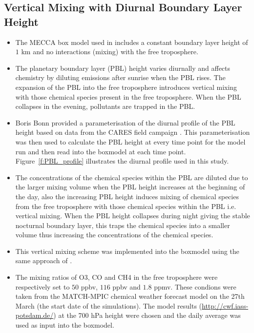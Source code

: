 \subsection{Vertical Mixing with Diurnal Boundary Layer Height} \label{ss:vertical_mixing}
\begin{itemize}
    \item The MECCA box model used in \citet{Coates:2015} includes a constant boundary layer height of $1$ km and no interactions (mixing) with the free troposphere.
    \item The planetary boundary layer (PBL) height varies diurnally and affects chemistry by diluting emissions after sunrise when the PBL rises. The expansion of the PBL into the free troposphere introduces vertical mixing with those chemical species present in the free troposphere. When the PBL collapses in the evening, pollutants are trapped in the PBL.
    \item Boris Bonn provided a parameterisation of the diurnal profile of the PBL height based on data from the CARES field campaign \citep{CARES:2008} . This parameterisation was then used to calculate the PBL height at every time point for the model run and then read into the boxmodel at each time point. Figure~\ref{f:PBL_profile} illustrates the diurnal profile used in this study.
    \item The concentrations of the chemical species within the PBL are diluted due to the larger mixing volume when the PBL height increases at the beginning of the day, also the increasing PBL height induces mixing of chemical species from the free troposphere with those chemical species within the PBL i.e. vertical mixing. When the PBL height collapses during night giving the stable nocturnal boundary layer, this traps the chemical species into a smaller volume thus increasing the concentrations of the chemical species.
    \item This vertical mixing scheme was implemented into the boxmodel using the same approach of \citet{Lourens:2012}.
    \item The mixing ratios of O3, CO and CH4 in the free troposphere were respectively set to $50$ ppbv, $116$ ppbv and $1.8$ ppmv. These condions were taken from the MATCH-MPIC chemical weather forecast model on the 27th March (the start date of the simulations). The model results (\url{http://cwf.iass-potsdam.de/}) at the 700 hPa height were chosen and the daily average was used as input into the boxmodel. 
\end{itemize}
